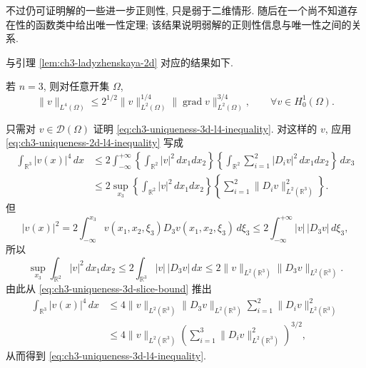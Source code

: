 不过仍可证明解的一些进一步正则性, 只是弱于二维情形. 随后在一个尚不知道存在性的函数类中给出唯一性定理; 该结果说明弱解的正则性信息与唯一性之间的关系.

与引理 \ref{lem:ch3-ladyzhenskaya-2d} 对应的结果如下.

\begin{Lemma}
\label{lem:ch3-ladyzhenskaya-3d}
若 $n=3$, 则对任意开集 $\Omega$,
\begin{equation}
\lVert v\rVert_{L^4(\Omega)}
\leq2^{1/2}\lVert v\rVert_{L^2(\Omega)}^{1/4}
\lVert\operatorname{grad}v\rVert_{L^2(\Omega)}^{3/4},
\qquad\forall v\in H_0^1(\Omega).
\label{eq:ch3-uniqueness-3d-l4-inequality}
\end{equation}
\end{Lemma}

\begin{Proof}
只需对 $v\in\mathcal D(\Omega)$ 证明 \eqref{eq:ch3-uniqueness-3d-l4-inequality}. 对这样的 $v$, 应用 \eqref{eq:ch3-uniqueness-2d-l4-inequality} 写成
\begin{equation}
\begin{aligned}
\int_{\mathbb R^3}|v(x)|^4\,dx
&\leq2\int_{-\infty}^{+\infty}
\left\{\int_{\mathbb R^2}|v|^2\,dx_1dx_2\right\}
\left\{\int_{\mathbb R^2}\sum_{i=1}^{2}|D_iv|^2\,dx_1dx_2\right\}\,dx_3\\
&\leq2\sup_{x_3}\left\{\int_{\mathbb R^2}|v|^2\,dx_1dx_2\right\}
\left\{\sum_{i=1}^{2}\lVert D_iv\rVert_{L^2(\mathbb R^3)}^2\right\}.
\end{aligned}
\label{eq:ch3-uniqueness-3d-slice-bound}
\end{equation}
但
\[
|v(x)|^2=2\int_{-\infty}^{x_3}v(x_1,x_2,\xi_3)D_3v(x_1,x_2,\xi_3)\,d\xi_3
\leq2\int_{-\infty}^{+\infty}|v|\,|D_3v|\,d\xi_3,
\]
所以
\[
\sup_{x_3}\int_{\mathbb R^2}|v|^2\,dx_1dx_2
\leq2\int_{\mathbb R^3}|v|\,|D_3v|\,dx
\leq2\lVert v\rVert_{L^2(\mathbb R^3)}\lVert D_3v\rVert_{L^2(\mathbb R^3)}.
\]
由此从 \eqref{eq:ch3-uniqueness-3d-slice-bound} 推出
\[
\begin{aligned}
\int_{\mathbb R^3}|v(x)|^4\,dx
&\leq4\lVert v\rVert_{L^2(\mathbb R^3)}\lVert D_3v\rVert_{L^2(\mathbb R^3)}
\sum_{i=1}^{2}\lVert D_iv\rVert_{L^2(\mathbb R^3)}^2\\
&\leq4\lVert v\rVert_{L^2(\mathbb R^3)}
\left(\sum_{i=1}^{3}\lVert D_iv\rVert_{L^2(\mathbb R^3)}^2\right)^{3/2},
\end{aligned}
\]
从而得到 \eqref{eq:ch3-uniqueness-3d-l4-inequality}.
\end{Proof}

